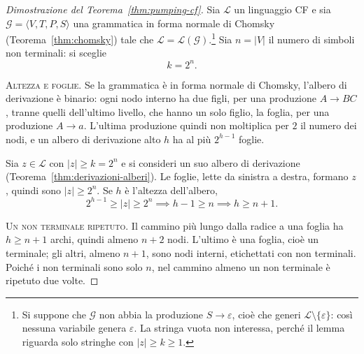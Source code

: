 \documentclass[a4paper, 11pt, oneside]{book}
\theoremstyle{formale}
\begin{document}
    \begin{proof}[Dimostrazione del Teorema~\ref{thm:pumping-cf}]
        Sia $\mathcal{L}$ un linguaggio CF e sia
        $\mathcal{G} = \langle V, T, P, S \rangle$ una grammatica in forma normale di
        Chomsky (Teorema~\ref{thm:chomsky}) tale che
        $\mathcal{L} = \mathcal{L}(\mathcal{G})$.\footnote{Si suppone che $\mathcal{G}$
        non abbia la produzione $S \to \varepsilon$, cio\`e che generi
        $\mathcal{L} \setminus \{\varepsilon\}$: cos\`i nessuna variabile genera
        $\varepsilon$. La stringa vuota non interessa, perch\'e il lemma riguarda solo
        stringhe con $|z| \geq k \geq 1$.} Sia $n = |V|$ il numero di simboli non
        terminali: si sceglie
        \begin{equation*}
            k = 2^n.
        \end{equation*}

        \textsc{Altezza e foglie}. Se la grammatica \`e in forma normale di Chomsky,
        l'albero di derivazione \`e binario: ogni nodo interno ha due figli, per una
        produzione $A \to BC$, tranne quelli dell'ultimo livello, che hanno un solo figlio,
        la foglia, per una produzione $A \to a$. L'ultima produzione quindi non moltiplica
        per $2$ il numero dei nodi, e un albero di derivazione alto $h$ ha al pi\`u
        $2^{h-1}$ foglie.

        Sia $z \in \mathcal{L}$ con $|z| \geq k = 2^n$ e si consideri un suo albero di
        derivazione (Teorema~\ref{thm:derivazioni-alberi}). Le foglie, lette da sinistra a
        destra, formano $z$, quindi sono $|z| \geq 2^n$. Se $h$ \`e l'altezza
        dell'albero,
        \begin{equation*}
            2^{h-1} \geq |z| \geq 2^n \implies h - 1 \geq n \implies h \geq n + 1.
        \end{equation*}

        \textsc{Un non terminale ripetuto}. Il cammino pi\`u lungo dalla radice a una
        foglia ha $h \geq n + 1$ archi, quindi almeno $n + 2$ nodi. L'ultimo \`e una
        foglia, cio\`e un terminale; gli altri, almeno $n + 1$, sono nodi interni,
        etichettati con non terminali. Poich\'e i non terminali sono solo $n$, nel cammino
        almeno un non terminale \`e ripetuto due volte.


\end{proof}
\end{document}
